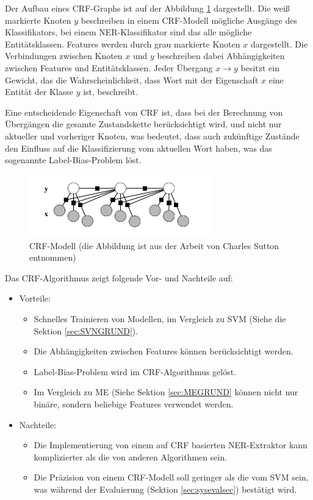 Der Aufbau eines CRF-Graphs ist auf der Abbildung \ref{fig:CRF-Modell} dargestellt. Die weiß markierte Knoten $y$ beschreiben in einem CRF-Modell mögliche Ausgänge des Klassifikators, bei einem NER-Klassifikator sind das alle mögliche Entitätsklassen. Features werden durch grau markierte Knoten $x$ dargestellt. Die Verbindungen zwischen Knoten $x$ und $y$ beschreiben dabei Abhängigkeiten zwischen Features und Entitätsklassen. Jeder Übergang $x \longrightarrow y$ besitzt ein Gewicht, das die Wahrscheinlichkeit, dass Wort mit der Eigenschaft $x$ eine Entität der Klasse $y$ ist, beschreibt.

Eine entscheidende Eigenschaft von CRF ist, dass bei der Berechnung von Übergängen die gesamte Zustandskette berücksichtigt wird, und nicht nur aktueller und vorheriger Knoten\cite{rossler2007korpus}, was bedeutet, dass auch zukünftige Zustände den Einfluss auf die Klassifizierung vom aktuellen Wort haben, was das sogenannte Label-Bias-Problem\cite{lafferty2001conditional} löst.

\begin{figure}[ht]
\vbox{\small}
\includegraphics[width=0.7\textwidth]{Bilder/crf-modell-charles-andrew}
\caption{CRF-Modell (die Abbildung ist aus der Arbeit von Charles Sutton \cite{Charles/Andrew:10} entnommen)}
\label{fig:CRF-Modell}
\end{figure}

Das CRF-Algorithmus zeigt folgende Vor- und Nachteile auf:
\begin{itemize}
\item Vorteile:
\begin{itemize}
\item Schnelles Trainieren von Modellen\cite{sha2003shallow}, im Vergleich zu SVM (Siehe die Sektion \ref{sec:SVNGRUND}).
\item Die Abhängigkeiten zwischen Features können berücksichtigt werden.
\item Label-Bias-Problem wird im CRF-Algorithmus gelöst.
\item Im Vergleich zu ME (Siehe Sektion \ref{sec:MEGRUND} können nicht nur binäre, sondern beliebige Features verwendet werden.
\end{itemize}
\item Nachteile:
\begin{itemize}
\item Die Implementierung von einem auf CRF basierten NER-Extraktor kann komplizierter als die von anderen Algorithmen sein.
\item Die Präzision von einem CRF-Modell soll geringer als die vom SVM sein, was während der Evaluierung (Sektion \ref{sec:sysevalsec}) bestätigt wird.
\end{itemize}
\end{itemize}

